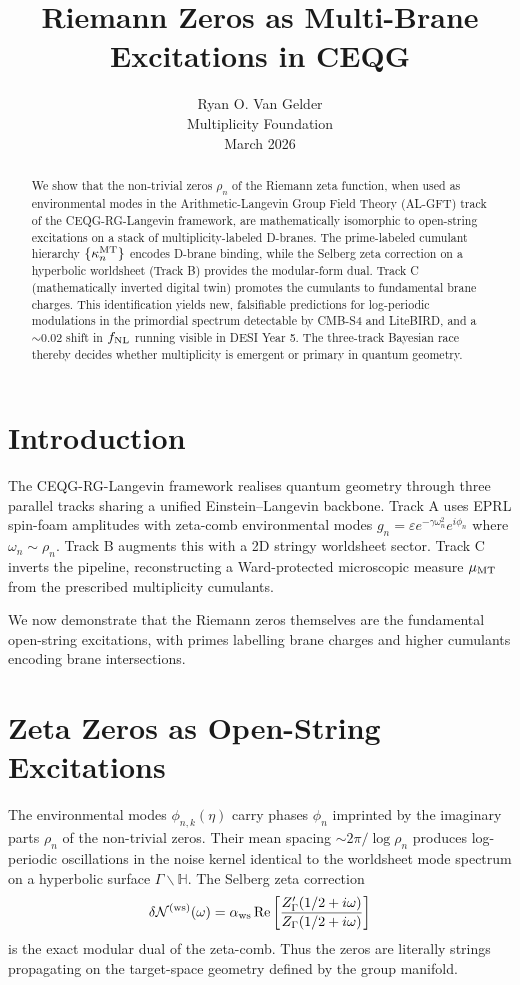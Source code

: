 \documentclass[11pt,a4paper]{article}
\title{Riemann Zeros as Multi-Brane Excitations in CEQG}
\author{Ryan O. Van Gelder \\ Multiplicity Foundation \\ March 2026}
\date{}
\begin{document}
\maketitle

\begin{abstract}
We show that the non-trivial zeros \(\rho_n\) of the Riemann zeta function, when used as environmental modes in the Arithmetic-Langevin Group Field Theory (AL-GFT) track of the CEQG-RG-Langevin framework, are mathematically isomorphic to open-string excitations on a stack of multiplicity-labeled D-branes. The prime-labeled cumulant hierarchy \(\{\kappa_n^{\rm MT}\}\) encodes D-brane binding, while the Selberg zeta correction on a hyperbolic worldsheet (Track B) provides the modular-form dual. Track C (mathematically inverted digital twin) promotes the cumulants to fundamental brane charges. This identification yields new, falsifiable predictions for log-periodic modulations in the primordial spectrum detectable by CMB-S4 and LiteBIRD, and a \(\sim 0.02\) shift in \(f_{\rm NL}\) running visible in DESI Year 5. The three-track Bayesian race thereby decides whether multiplicity is emergent or primary in quantum geometry.
\end{abstract}

\section{Introduction}
The CEQG-RG-Langevin framework realises quantum geometry through three parallel tracks sharing a unified Einstein--Langevin backbone. Track A uses EPRL spin-foam amplitudes with zeta-comb environmental modes \(g_n = \varepsilon e^{-\gamma \omega_n^2} e^{i\phi_n}\) where \(\omega_n \sim \rho_n\). Track B augments this with a 2D stringy worldsheet sector. Track C inverts the pipeline, reconstructing a Ward-protected microscopic measure \(\mu_{\rm MT}\) from the prescribed multiplicity cumulants.

We now demonstrate that the Riemann zeros themselves are the fundamental open-string excitations, with primes labelling brane charges and higher cumulants encoding brane intersections.

\section{Zeta Zeros as Open-String Excitations}
The environmental modes \(\phi_{n,k}(\eta)\) carry phases \(\phi_n\) imprinted by the imaginary parts \(\rho_n\) of the non-trivial zeros. Their mean spacing \(\sim 2\pi / \log\rho_n\) produces log-periodic oscillations in the noise kernel identical to the worldsheet mode spectrum on a hyperbolic surface \(\Gamma\backslash\mathbb{H}\). The Selberg zeta correction
\[
\delta\mathcal{N}^{(\rm ws)}(\omega) = \alpha_{\rm ws} \operatorname{Re}\left[\frac{Z_\Gamma'(1/2+i\omega)}{Z_\Gamma(1/2+i\omega)}\right]
\]
is the exact modular dual of the zeta-comb. Thus the zeros are literally strings propagating on the target-space geometry defined by the group manifold.
\end{document}

